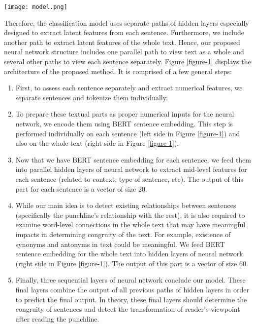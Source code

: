 \documentclass[journal]{IEEEtran}
\begin{document}
\begin{figure*}[t]
\begin {center}
 \texttt{[image: model.png]}
 \caption{Components of the proposed method}
  \label{figure-1}
 \end {center}
\end{figure*}

Therefore, the classification model uses separate paths of hidden layers especially designed to extract latent features from each sentence. Furthermore, we include another path to extract latent features of the whole text. Hence, our proposed neural network structure includes one parallel path to view text as a whole and several other paths to view each sentence separately. Figure \ref{figure-1} displays the architecture of the proposed method. It is comprised of a few general steps:

\begin{enumerate}
    \item First, to assess each sentence separately and extract numerical features, we separate sentences and tokenize them individually.
    \item To prepare these textual parts as proper numerical inputs for the neural network, we encode them using BERT sentence embedding. This step is performed individually on each sentence (left side in Figure \ref{figure-1}) and also on the whole text (right side in Figure \ref{figure-1}).
    \item Now that we have BERT sentence embedding for each sentence, we feed them into parallel hidden layers of neural network to extract mid-level features for each sentence (related to context, type of sentence, etc). The output of this part for each sentence is a vector of size 20.
    \item While our main idea is to detect existing relationships between sentences (specifically the punchline's relationship with the rest), it is also required to examine word-level connections in the whole text that may have meaningful impacts in determining congruity of the text. For example, existence of synonyms and antonyms in text could be meaningful. We feed BERT sentence embedding for the whole text into hidden layers of neural network (right side in Figure \ref{figure-1}). The output of this part is a vector of size 60.
    \item Finally, three sequential layers of neural network conclude our model. These final layers combine the output of all previous paths of hidden layers in order to predict the final output. In theory, these final layers should determine the congruity of sentences and detect the transformation of reader's viewpoint after reading the punchline.
\end{enumerate}
\end{document}
